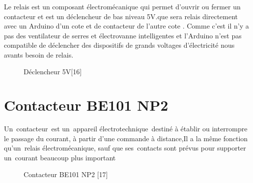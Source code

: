 Le relais est un composant électromécanique qui permet d'ouvrir ou fermer un contacteur et est un déclencheur de bas niveau 5V.que sera relais directement avec un Arduino d’un cote et de contacteur de l’autre cote . Comme c’est il n’y a pas des ventilateur de serres et électrovanne intelligentes et l’Arduino n’est pas compatible de déclencher des dispositifs de grands voltages d’électricité nous avants besoin de relais. 
\begin{figure}[hbt]
\centering
\label{fig:Déclencheur 5V}

  \caption{Déclencheur 5V[16]}
\end{figure}
\section{Contacteur BE101 NP2}
Un contacteur est un appareil électrotechnique destiné à établir ou interrompre le passage du courant, à partir d'une commande à distance,Il a la même fonction qu'un relais électromécanique, sauf que ses contacts sont prévus pour supporter un courant beaucoup plus important
\begin{figure}[hbt]
\centering
\label{Contacteur BE101 NP2}
  \caption{Contacteur BE101 NP2 [17]}
\end{figure}
